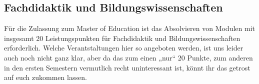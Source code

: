\subsection{Fachdidaktik und Bildungswissenschaften}

Für die Zulassung zum Master of Education ist das Absolvieren von Modulen mit
insgesamt 20 Leistungspunkten für Fachdidaktik und Bildungswissenschaften
erforderlich. Welche Verantstaltungen hier so angeboten werden, ist uns leider
auch noch nicht ganz klar, aber da das zum einen „nur“ 20 Punkte, zum anderen
in den ersten Semestern vermutlich recht uninteressant ist, könnt ihr das
getrost auf euch zukommen lassen.


%
%
%
%
%



